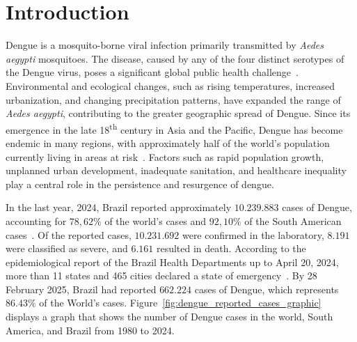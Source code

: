 \chapter{Introduction}\label{chp:introduction}

Dengue is a mosquito-borne viral infection primarily transmitted by
\textit{Aedes aegypti} mosquitoes. The disease, caused by any of the four
distinct serotypes of the Dengue virus, poses a significant global public health
challenge~\citep{shepard:2016}. Environmental and ecological changes, such as
rising temperatures, increased urbanization, and changing precipitation
patterns, have expanded the range of \textit{Aedes aegypti}, contributing to the
greater geographic spread of Dengue. Since its emergence in the late
18\textsuperscript{th} century in Asia and the Pacific, Dengue has become
endemic in many regions, with approximately half of the world's population
currently living in areas at risk~\citep{fares:2015,negreiros-2020}. Factors
such as rapid population growth, unplanned urban development, inadequate
sanitation, and healthcare inequality play a central role in the persistence and
resurgence of dengue.


In the last year, 2024, Brazil reported approximately $10.239.883$ cases of
Dengue, accounting for $78,62\%$ of the world's cases and $92,10\%$ of the South
American cases~\citep{BardachEtal2019}. Of the reported cases, $10.231.692$ were
confirmed in the laboratory, $8.191$ were classified as severe, and $6.161$
resulted in death. According to the epidemiological report of the Brazil Health
Departments up to April 20, 2024, more than 11 states and 465 cities declared a
state of emergency~\citep{health-dp-1}. By 28 February 2025, Brazil had reported
$662.224$ cases of Dengue, which represents $86.43\%$ of the World's cases.
Figure~\ref{fig:dengue_reported_cases_graphic} displays a graph that shows
the number of Dengue cases in the world, South America, and Brazil from 1980 to
2024.

